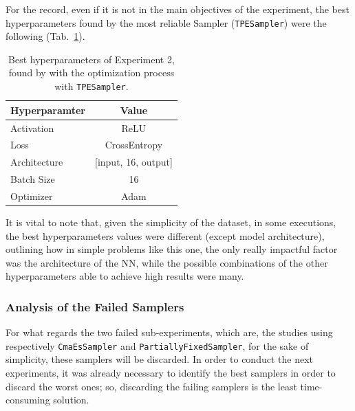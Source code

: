 For the record, even if it is not in the main objectives of the experiment, the best hyperparameters found by the most reliable Sampler (\texttt{TPESampler}) were the following (Tab.~\ref{tab:table-4.2.3}).
\begin{table}[ht!]
	\center
	\setlength{\tabcolsep}{0.5cm}
	\caption[Best Hyperparameters of Experiment 2]{Best hyperparameters of Experiment 2, found by with the optimization process with \texttt{TPESampler}.}
	\begin{tabular}{@{}lc@{}}
		\toprule
		\textbf{Hyperparamter} & \textbf{Value}          \\ \midrule
		Activation             & ReLU                    \\[0.1cm]
		Loss                   & CrossEntropy            \\[0.1cm]
		Architecture           & {[}input, 16, output{]} \\[0.1cm]
		Batch Size             & 16                      \\[0.1cm]
		Optimizer              & Adam                    \\ \bottomrule
	\end{tabular}
	\label{tab:table-4.2.3}
\end{table}
It is vital to note that, given the simplicity of the dataset, in some executions, the best hyperparameters values were different (except model architecture), outlining how in simple problems like this one, the only really impactful factor was the architecture of the NN, while the possible combinations of the other hyperparameters able to achieve high results were many.

\subsubsection{Analysis of the Failed Samplers}

For what regards the two failed sub-experiments, which are, the studies using respectively \texttt{CmaEsSampler} and \texttt{PartiallyFixedSampler}, for the sake of simplicity, these samplers will be discarded.
In order to conduct the next experiments, it was already necessary to identify the best samplers in order to discard the worst ones; so, discarding the failing samplers is the least time-consuming solution.


